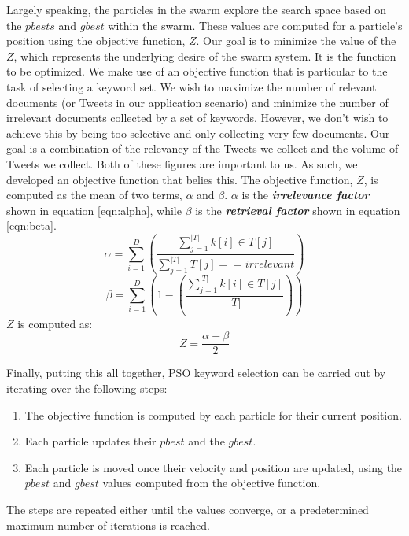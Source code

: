 \documentclass[runningheads]{llncs}
\begin{document}
Largely speaking, the particles in the swarm explore the search space based on the $pbests$ and $gbest$ within the swarm. These values are computed for a particle's position using the objective function, $Z$. Our goal is to minimize the value of the $Z$, which represents the underlying desire of the swarm system. It is the function to be optimized. We make use of an objective function that is particular to the task of selecting a keyword set. We wish to maximize the number of relevant documents (or Tweets in our application scenario) and minimize the number of irrelevant documents collected by a set of keywords. However, we don't wish to achieve this by being too selective and only collecting very few documents. Our goal is a combination of the relevancy of the Tweets we collect and the volume of Tweets we collect. Both of these figures are important to us. As such, we developed an objective function that belies this. The objective function, $Z$, is computed as the mean of two terms, $\alpha$ and $\beta$. $\alpha$ is the \textit{\textbf{irrelevance factor}} shown in equation \ref{eqn:alpha}, while $\beta$ is the \textit{\textbf{retrieval factor}} shown in equation \ref{eqn:beta}.
\begin{equation}
	\alpha = \sum_{i=1}^D (\frac{\sum_{j=1}^{|T|}k[i] \in T[j]}{\sum_{j=1}^{|T|}T[j] == irrelevant})
	\label{eqn:alpha}
\end{equation}
\begin{equation}
	\beta = \sum_{i=1}^D (1 - (\frac{\sum_{j=1}^{|T|}k[i] \in T[j]}{|T|}))
	\label{eqn:beta}
\end{equation}{}
$Z$ is computed as:
\begin{equation}
	Z = \frac{\alpha + \beta}{2}
	\label{eqn:objective}
\end{equation}{}

Finally, putting this all together, PSO keyword selection can be carried out by iterating over the following steps:
\begin{enumerate}
	\item The objective function is computed by each particle for their current position.
	\item Each particle updates their $pbest$ and the $gbest$.
	\item Each particle is moved once their velocity and position are updated, using the $pbest$ and $gbest$ values computed from the objective function.
\end{enumerate}
The steps are repeated either until the values converge, or a predetermined maximum number of iterations is reached.
\end{document}
